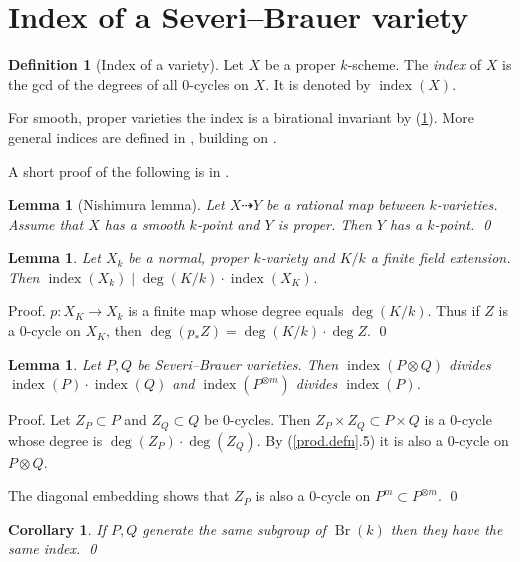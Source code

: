 \documentclass{amsart}
\newtheorem{lem}[thm]{Lemma}
\newtheorem{cor}[thm]{Corollary}
\theoremstyle{definition}
\newtheorem{defn}[thm]{Definition}
\theoremstyle{remark}
\newcommand{\map}[0]{\dasharrow}
\newcommand{\br}[0]{\operatorname{Br}}
\newcommand{\ind}[0]{\operatorname{index}}
\begin{document}
\section{Index of a Severi--Brauer variety}\label{sec.8}

\begin{defn}[Index of a  variety] Let $X$ be a proper  $k$-scheme.
The {\it index} of $X$ is the gcd of the degrees of all 
 0-cycles on $X$.
It is denoted by  $\ind(X)$.  

For smooth, proper varieties the index is a birational invariant by (\ref{nishi.lem}).
More general indices are defined in \cite{k-elw}, building on  \cite {MR3383601}. 
\end{defn}

A short proof of the following is in \cite[p.183]{ksc}.

\begin{lem}[Nishimura lemma]\label{nishi.lem} Let $X\map Y$ be a rational map
between $k$-varieties. Assume that $X$ has a smooth $k$-point and $Y$ is proper. Then $Y$ has a $k$-point. \qed
\end{lem}

\begin{lem}\label{submult.index.lem}
 Let $X_k$ be a normal, proper  $k$-variety
and $K/k$ a finite field extension. Then
$\ind(X_k)\mid \deg (K/k)\cdot \ind(X_K)$.
\end{lem}

Proof. $p:X_K\to X_k$ is a finite map whose degree equals
$\deg (K/k) $. Thus  if $Z$ is a 0-cycle on $X_K$, then
$\deg (p_*Z)=\deg (K/k)\cdot\deg Z$. \qed

\begin{lem} \label{ind.of.prods}
Let $P,Q$ be Severi--Brauer varieties. Then
$\ind(P\otimes Q)$ divides $\ind(P)\cdot \ind(Q)$
and  $\ind(P^{\otimes m})$ divides  $\ind(P)$.
\end{lem}

Proof. Let $Z_P\subset P$ and $Z_Q\subset Q$ be 0-cycles.
Then $Z_P\times Z_Q\subset P\times Q$ is a 0-cycle
whose degree is $\deg(Z_P)\cdot\deg(Z_Q)$. By
(\ref{prod.defn}.5) it is also a 0-cycle on $P\otimes Q $.

The diagonal embedding shows that $Z_P$ is also a 0-cycle on
$P^m\subset P^{\otimes m}$. \qed



\begin{cor} If $P, Q$ generate the same subgroup of $\br(k)$ then they have the same index. \qed
\end{cor}
\end{document}

